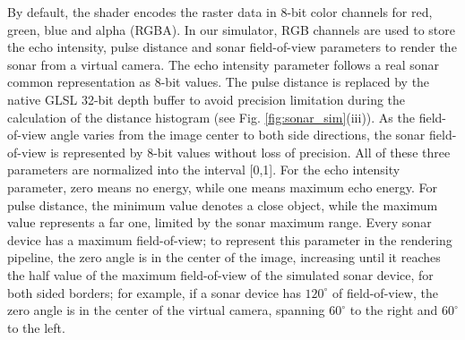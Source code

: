 \documentclass[final,5p,times]{elsarticle}
\begin{document}
By default, the shader encodes the raster data in 8-bit color channels for red, green, blue and alpha (RGBA). In our simulator, RGB channels are used to store the echo intensity, pulse distance and sonar field-of-view parameters to render the sonar from a virtual camera. The echo intensity parameter follows a real sonar common representation as 8-bit values. The pulse distance is replaced by the native GLSL 32-bit depth buffer to avoid precision limitation during the calculation of the distance histogram (see Fig. \ref{fig:sonar_sim}(iii)). As the field-of-view angle varies from the image center to both side directions, the sonar field-of-view is represented by 8-bit values without loss of precision. All of these three parameters are normalized into the interval [0,1]. For the echo intensity parameter, zero means no energy, while one means maximum echo energy. For pulse distance, the minimum value denotes a close object, while the maximum value represents a far one, limited by the sonar maximum range. Every sonar device has a maximum field-of-view; to represent this parameter in the rendering pipeline, the zero angle is in the center of the image, increasing until it reaches the half value of the maximum field-of-view of the simulated sonar device, for both sided borders; for example, if a sonar device has $120^{\circ}$ of field-of-view, the zero angle is in the center of the virtual camera, spanning $60^{\circ}$ to the right and $60^{\circ}$ to the left.
\end{document}

